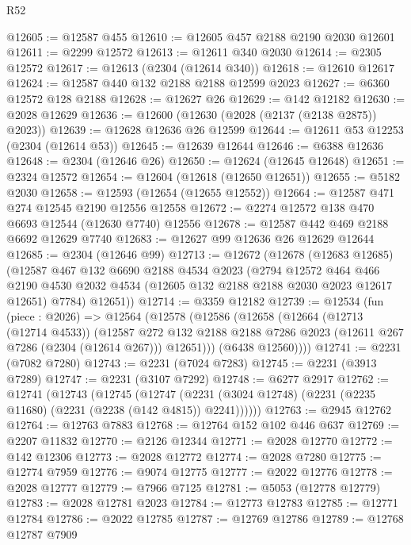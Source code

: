 \begin{lexlean}{R52}
\begin{coremodule}
@12605 := @12587 @455
@12610 := @12605 @457 @2188 @2190 @2030 @12601
@12611 := @2299 @12572
@12613 := @12611 @340 @2030
@12614 := @2305 @12572
@12617 := @12613 (@2304 (@12614 @340))
@12618 := @12610 @12617
@12624 := @12587 @440 @132 @2188 @2188 @12599 @2023
@12627 := @6360 @12572 @128 @2188
@12628 := @12627 @26
@12629 := @142 @12182
@12630 := @2028 @12629
@12636 := @12600 (@12630 (@2028 (@2137 (@2138 @2875)) @2023))
@12639 := @12628 @12636 @26 @12599
@12644 := @12611 @53 @12253 (@2304 (@12614 @53))
@12645 := @12639 @12644
@12646 := @6388 @12636
@12648 := @2304 (@12646 @26)
@12650 := @12624 (@12645 @12648)
@12651 := @2324 @12572
@12654 := @12604 (@12618 (@12650 @12651))
@12655 := @5182 @2030
@12658 := @12593 (@12654 (@12655 @12552))
@12664 := @12587 @471 @274 @12545 @2190 @12556 @12558
@12672 := @2274 @12572 @138 @470 @6693 @12544 (@12630 @7740) @12556
@12678 := @12587 @442 @469 @2188 @6692 @12629 @7740
@12683 := @12627 @99 @12636 @26 @12629 @12644
@12685 := @2304 (@12646 @99)
@12713 := @12672
    (@12678
      (@12683 @12685)
      (@12587
        @467
        @132
        @6690
        @2188
        @4534
        @2023
        (@2794
          @12572
          @464
          @466
          @2190
          @4530
          @2032
          @4534
          (@12605 @132 @2188 @2188 @2030 @2023 @12617 @12651)
          @7784)
        @12651))
@12714 := @3359 @12182
@12739 := @12534
    (fun (piece : @2026) =>
    @12564
      (@12578
        (@12586
          (@12658
            (@12664
              (@12713 (@12714 @4533))
              (@12587
                @272
                @132
                @2188
                @2188
                @7286
                @2023
                (@12611 @267 @7286 (@2304 (@12614 @267)))
                @12651)))
          (@6438 @12560))))
@12741 := @2231 (@7082 @7280)
@12743 := @2231 (@7024 @7283)
@12745 := @2231 (@3913 @7289)
@12747 := @2231 (@3107 @7292)
@12748 := @6277 @2917
@12762 := @12741
    (@12743
      (@12745
        (@12747 (@2231 (@3024 @12748) (@2231 (@2235 @11680) (@2231 (@2238 (@142 @4815)) @2241))))))
@12763 := @2945 @12762
@12764 := @12763 @7883
@12768 := @12764 @152 @102 @446 @637
@12769 := @2207 @11832
@12770 := @2126 @12344
@12771 := @2028 @12770
@12772 := @142 @12306
@12773 := @2028 @12772
@12774 := @2028 @7280
@12775 := @12774 @7959
@12776 := @9074 @12775
@12777 := @2022 @12776
@12778 := @2028 @12777
@12779 := @7966 @7125
@12781 := @5053 (@12778 @12779)
@12783 := @2028 @12781 @2023
@12784 := @12773 @12783
@12785 := @12771 @12784
@12786 := @2022 @12785
@12787 := @12769 @12786
@12789 := @12768 @12787 @7909

\end{coremodule}
\end{lexlean}
